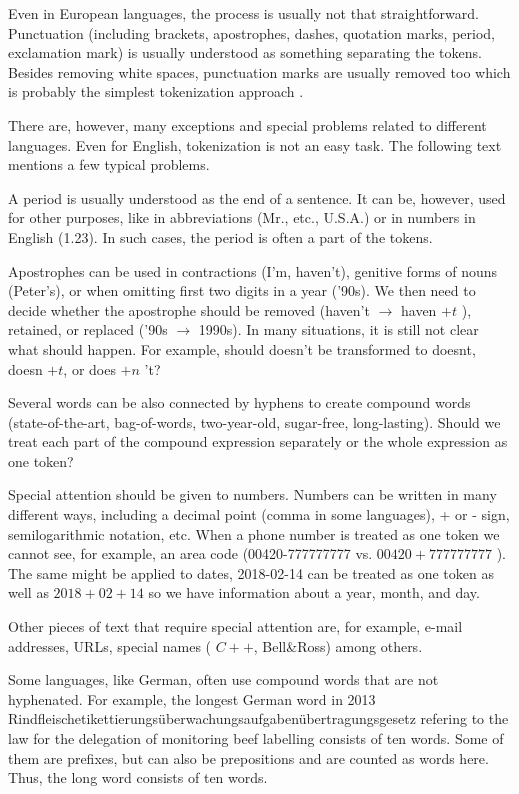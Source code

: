 \documentclass[11pt,openany,executivepaper]{book}
\begin{document}
Even in European languages, the process is usually not that straightforward. Punctuation (including brackets, apostrophes, dashes, quotation marks, period, exclamation mark) is usually understood as something separating the tokens. Besides removing white spaces, punctuation marks are usually removed too which is probably the simplest tokenization approach \cite{275,211}.

There are, however, many exceptions and special problems related to different languages. Even for English, tokenization is not an easy task. The following text mentions a few typical problems.

A period is usually understood as the end of a sentence. It can be, however, used for other purposes, like in abbreviations (Mr., etc., U.S.A.) or in numbers in English (1.23). In such cases, the period is often a part of the tokens.

Apostrophes can be used in contractions (I'm, haven't), genitive forms of nouns (Peter's), or when omitting first two digits in a year ('90s). We then need to decide whether the apostrophe should be removed (haven't $\rightarrow$ haven $+t$ ), retained, or replaced ('90s $\rightarrow$ 1990s). In many situations, it is still not clear what should happen. For example, should doesn't be transformed to doesnt, doesn $+t$, or does $+n$ 't?

Several words can be also connected by hyphens to create compound words (state-of-the-art, bag-of-words, two-year-old, sugar-free, long-lasting). Should we treat each part of the compound expression separately or the whole expression as one token?

Special attention should be given to numbers. Numbers can be written in many different ways, including a decimal point (comma in some languages), + or - sign, semilogarithmic notation, etc. When a phone number is treated as one token we cannot see, for example, an area code (00420-777777777 vs. $00420+777777777$ ). The same might be applied to dates, 2018-02-14 can be treated as one token as well as $2018+02+14$ so we have information about a year, month, and day.

Other pieces of text that require special attention are, for example, e-mail addresses, URLs, special names ( $C++$, Bell\&Ross) among others.

Some languages, like German, often use compound words that are not hyphenated. For example, the longest German word in 2013 \cite{265} Rindfleischetikettierungsüberwachungsaufgabenübertragungsgesetz refering to the law for the delegation of monitoring beef labelling consists of ten words. Some of them are prefixes, but can also be prepositions and are counted as words here. Thus, the long word consists of ten words.
\end{document}
